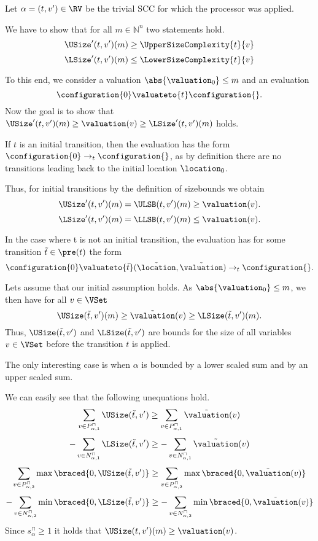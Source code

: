 Let $\alpha = (t, v') \in \RV$ be the trivial SCC for which the processor was applied.

We have to show that for all $m \in \mathbb{N}^n$ two statements hold.
\[ \USize'(t, v')(m) \geq \UpperSizeComplexity{t}{v} \]
\[ \LSize'(t, v')(m) \leq \LowerSizeComplexity{t}{v} \]

To this end, we consider a valuation $\abs{\valuation_0} \leq m$ and an evaluation
\[ \configuration{0} \valuateto{t} \configuration{} . \]
Now the goal is to show that $\USize'(t, v')(m) \geq \valuation(v) \geq \LSize'(t, v')(m)$ holds.

If $t$ is an initial transition, then the evaluation has the form $\configuration{0} \rightarrow_t \configuration{}$, as by definition there are no transitions leading back to the initial location $\location_0$.

Thus, for initial transitions by the definition of sizebounds we obtain
\[ \USize'(t, v')(m) = \ULSB(t, v')(m) \geq \valuation(v). \]
\[ \LSize'(t, v')(m) = \LLSB(t, v')(m) \leq \valuation(v). \]

In the case where t is not an initial transition, the evaluation has for some transition $\tilde{t} \in \pre(t)$ the form
\[ \configuration{0}  \valuateto{\tilde{t}} (\tilde{\location}, \tilde{\valuation}) \rightarrow_t \configuration{}. \]

Lets assume that our initial assumption holds.
As $\abs{\valuation_0} \leq m$, we then have for all $v \in \VSet$
\[ \USize(\tilde{t}, v')(m) \geq \tilde{\valuation}(v) \geq \LSize(\tilde{t}, v')(m). \]
Thus, $\USize(\tilde{t}, v')$ and $\LSize(\tilde{t}, v')$ are bounds for the size of all variables $v \in \VSet$ before the transition $t$ is applied.

The only interesting case is when $\alpha$ is bounded by a lower scaled sum and by an upper scaled sum.

We can easily see that the following unequations hold.
\[ \sum_{v \in P_{\alpha,1}^\sqcap} \USize(\tilde{t}, v') \geq \sum_{v \in P_{\alpha,1}^\sqcap} \tilde{\valuation}(v) \]
\[ - \sum_{v \in N_{\alpha,1}^\sqcap} \LSize(\tilde{t}, v') \geq - \sum_{v \in N_{\alpha,1}^\sqcap} \tilde{\valuation}(v) \]
\[ \sum_{v \in P_{\alpha,2}^\sqcap} \max \braced{0,\USize(\tilde{t}, v')} \geq \sum_{v \in P_{\alpha,2}^\sqcap} \max \braced{0,\tilde{\valuation}(v)} \]
\[ - \sum_{v \in N_{\alpha,2}^\sqcap} \min \braced{0,\LSize(\tilde{t}, v')} \geq - \sum_{v \in N_{\alpha,2}^\sqcap} \min \braced{0,\tilde{\valuation}(v)} \]
Since $s^\sqcap_\alpha \geq 1$ it holds that $\USize(t, v')(m) \geq \valuation(v)$.

